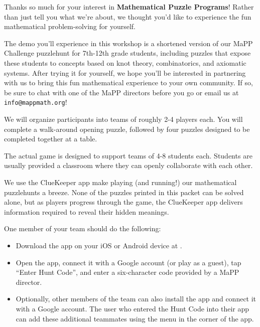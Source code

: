 \documentclass{puzzlehunt}
\title{\phEventName}
\author{Mathematical Puzzle Programs}
\date{\today}
\begin{document}

\phTitlePage


% 




Thanks so much for your interest in
\textbf{Mathematical Puzzle Programs}! Rather than
just tell you what we're about, we thought you'd like to
experience the fun mathematical problem-solving for yourself.

The demo you'll experience in this workshop is a shortened
version of our MaPP Challenge puzzlehunt for 7th-12th
grade students, including puzzles that expose these students
to concepts based on knot theory, combinatorics, and
axiomatic systems. After trying it for yourself, we hope
you'll be interested in partnering with us to bring this
fun mathematical experience to your own community.
If so, be sure to chat with one of the MaPP directors
before you go
or email us at \texttt{info@mappmath.org}! 


We will organize participants into teams of roughly
2-4 players each. You will complete a walk-around
opening puzzle, followed by four puzzles designed
to be completed together at a table.

The actual game is designed to support
teams of 4-8 students each. Students are usually
provided a classroom where they can openly collaborate
with each other.


We use the ClueKeeper app make playing (and running!)
our mathematical puzzlehunts a breeze.
None of the puzzles printed in this packet can be
solved alone, but as players progress through the game,
the ClueKeeper app delivers information required
to reveal their hidden meanings.

One member of your team should do the following:

\begin{itemize}
\item Download the app on your iOS or Android device
  at . 
\item Open the app, connect it with a Google account
  (or play as a guest), tap ``Enter Hunt Code'', and enter
  a six-character code provided by a MaPP director.
\item Optionally, other members of the team can also install the
app and connect it with a Google account. The user who
entered the Hunt Code into their app can add these additional
teammates using the menu in the corner of the app.
\end{itemize}
\end{document}
